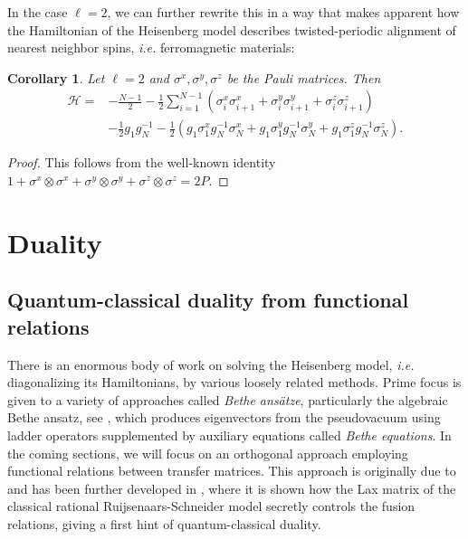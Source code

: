 \documentclass[11pt]{report}
\newtheorem{corollary}[theorem]{Corollary}
\theoremstyle{definition}
\theoremstyle{remark}
\theoremstyle{remark}
\begin{document}
In the case $\ell=2$, we can further rewrite this in a way that makes apparent how the Hamiltonian of the Heisenberg model describes twisted-periodic alignment of nearest neighbor spins, \emph{i.e.} ferromagnetic materials:

\begin{corollary}
Let $\ell = 2$ and $\sigma^x,\sigma^y,\sigma^z$ be the Pauli matrices. Then
\begin{align*}
\mathcal{H} = &- \frac{N-1}{2} - \frac{1}{2} \sum_{i=1}^{N-1} \left( \sigma_i^x \sigma_{i+1}^x + \sigma_i^y \sigma_{i+1}^y + \sigma_i^z \sigma_{i+1}^z \right) \\
&- \frac{1}{2} g_1 g_N^{-1} - \frac{1}{2} \left( g_1 \sigma_1^x g_N^{-1} \sigma_N^x + g_1 \sigma_1^y g_N^{-1} \sigma_N^y + g_1 \sigma_1^z g_N^{-1} \sigma_N^z \right).
\end{align*}
\end{corollary}

\begin{proof}
This follows from the well-known identity $1 + \sigma^x \otimes \sigma^x + \sigma^y \otimes \sigma^y + \sigma^z \otimes \sigma^z = 2P$.
\end{proof}


\chapter{Duality} \label{chapter:duality}

\section{Quantum-classical duality from functional relations}

There is an enormous body of work on solving the Heisenberg model, \emph{i.e.} diagonalizing its Hamiltonians, by various loosely related methods. Prime focus is given to a variety of approaches called \emph{Bethe ansätze}, particularly the algebraic Bethe ansatz, see \cite{book:arutyunov:betheAnsatz}, which produces eigenvectors from the pseudovacuum using ladder operators supplemented by auxiliary equations called \emph{Bethe equations}. In the coming sections, we will focus on an orthogonal approach employing functional relations between transfer matrices. This approach is originally due to \cite{article:kuniba:1994} and has been further developed in \cite{book:arutyunov:betheAnsatz}, where it is shown how the Lax matrix of the classical rational Ruijsenaars-Schneider model secretly controls the fusion relations, giving a first hint of quantum-classical duality.
\end{document}
